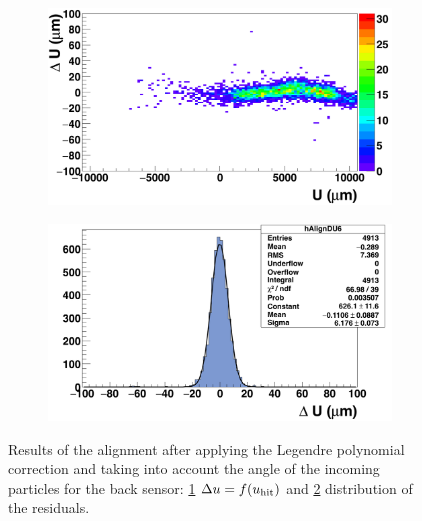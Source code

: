 \begin{figure}[!tbh]
        \begin{subfigure}[t]{0.45\textwidth}
          \centering
          \includegraphics[width = 1.2\textwidth]{Pictures/deformation/deltaUU_6_corrected1.png}
          \caption{}
          \label{fig:scatterDUU_corrected_back}
        \end{subfigure}
        \hfill
        \begin{subfigure}[t]{0.45\textwidth}
          \centering
          \includegraphics[width = 1.2\textwidth]{Pictures/deformation/deltaU_6_corrected1.png}
          \caption{}
          \label{fig:residualU_corrected_back}
        \end{subfigure}
        \caption{Results of the alignment after applying the Legendre polynomial correction and taking into account the angle of the incoming particles for the back sensor: \ref{fig:scatterDUU_corrected_back} $\Delta u=f(u_{\rm{hit}})$ and \ref{fig:residualU_corrected_back} distribution of the residuals.}
        \label{fig:alignmnetCorrected_back}

      \end{figure}

